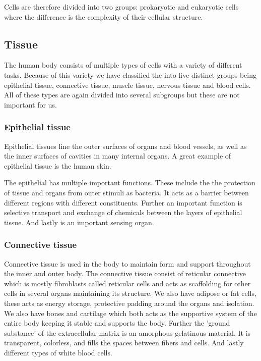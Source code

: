 \documentclass[jmp, amsmath, amssymb, reprint]{article}
\numberwithin{equation}{section}
\begin{document}
\begin{multicols}{2}
Cells are therefore divided into two groups: prokaryotic and eukaryotic cells where the difference is the complexity of their cellular structure.

\subsection{Tissue}

The human body consists of multiple types of cells with a variety of different tasks. Because of this variety we have classified the into five distinct groups being epithelial tissue, connective tissue, muscle tissue, nervous tissue and blood cells. All of these types are again divided into several subgroups but these are not important for us.

\subsubsection{Epithelial tissue}

Epithelial tissues line the outer surfaces of organs and blood vessels, as well as the inner surfaces of cavities in many internal organs. A great example of epithelial tissue is the human skin.

The epithelial has multiple important functions. These include the the protection of tissue and organs from outer stimuli as bacteria. It acts as a barrier between different regions with different constituents. Further an important function is selective transport and exchange of chemicals between the layers of epithelial tissue. And lastly is an important sensing organ.

\subsubsection{Connective tissue}

Connective tissue is used in the body to maintain form and support throughout the inner and outer body. The connective tissue consist of reticular connective which is mostly fibroblasts called reticular cells and acts as scaffolding for other cells in several organs maintaining its structure. We also have adipose or fat cells, these acts as energy storage, protective padding around the organs and isolation. We also have bones and cartilage which both acts as the supportive system of the entire body keeping it stable and supports the body. Further the 'ground substance' of the extracellular matrix is an amorphous gelatinous material. It is transparent, colorless, and fills the spaces between fibers and cells. And lastly different types of white blood cells.


\end{multicols}
\end{document}
